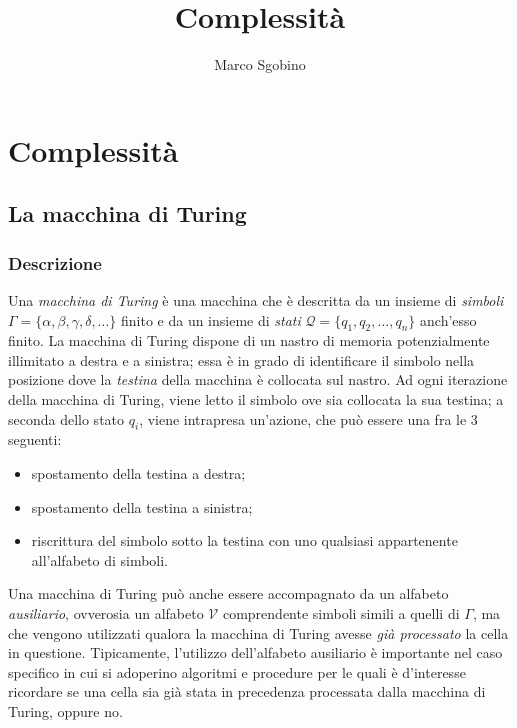 \documentclass[10pt]{book}
\begin{document}
\setmonofont[Scale=.85]{Fira Code Retina}

\title{Complessità}
\author{Marco Sgobino}
\maketitle
\tableofcontents

\part{Complessità}
\chapter{La macchina di Turing}
\section{Descrizione}

Una \emph{macchina di Turing} è una macchina che è descritta da un insieme di
\emph{simboli} $\Gamma = \{\alpha, \beta, \gamma, \delta, \dots\}$ finito e da
un insieme di \emph{stati} $\mathcal{Q} = \{q_1, q_2, \dots, q_n\}$ anch'esso
finito. La macchina di Turing dispone di un nastro di memoria potenzialmente
illimitato a destra e a sinistra; essa è in grado di identificare il simbolo
nella posizione dove la \emph{testina} della macchina è collocata sul nastro.
Ad ogni iterazione della macchina di Turing, viene letto il simbolo
ove sia collocata la sua testina; a seconda dello stato $q_i$, viene intrapresa
un'azione, che può essere una fra le $3$ seguenti:
\begin{itemize}
    \item spostamento della testina a destra;
    \item spostamento della testina a sinistra;
    \item riscrittura del simbolo sotto la testina con uno qualsiasi
        appartenente all'alfabeto di simboli.
\end{itemize}

Una macchina di Turing può anche essere accompagnato da un alfabeto
\emph{ausiliario}, ovverosia un alfabeto $\mathcal V$ comprendente simboli
simili a quelli di $\Gamma$, ma che vengono utilizzati qualora la macchina di
Turing avesse \emph{già processato} la cella in questione. Tipicamente,
l'utilizzo dell'alfabeto ausiliario è importante nel caso specifico in cui si
adoperino algoritmi e procedure per le quali è d'interesse ricordare se una
cella sia già stata in precedenza processata dalla macchina di Turing, oppure
no.
\end{document}
